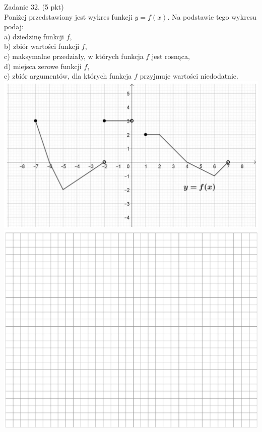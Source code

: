\documentclass[10pt]{article}
\begin{document}
Zadanie 32. (5 pkt)\\
Poniżej przedstawiony jest wykres funkcji \(y=f(x)\). Na podstawie tego wykresu podaj:\\
a) dziedzinę funkcji \(f\),\\
b) zbiór wartości funkcji \(f\),\\
c) maksymalne przedziały, w których funkcja \(f\) jest rosnąca,\\
d) miejsca zerowe funkcji \(f\),\\
e) zbiór argumentów, dla których funkcja \(f\) przyjmuje wartości niedodatnie.\\
\includegraphics[max width=\textwidth, center]{2024_11_21_55bf50695fa934dbe20eg-11}\\
\includegraphics[max width=\textwidth, center]{2024_11_21_55bf50695fa934dbe20eg-11(1)}
\end{document}
